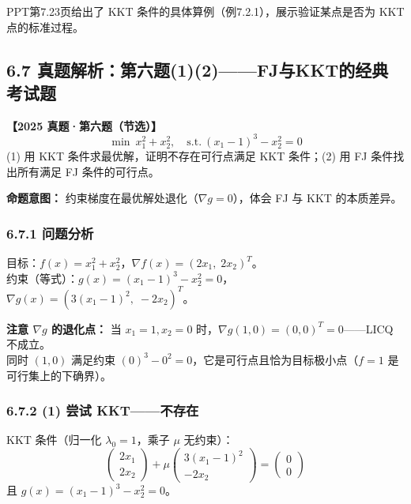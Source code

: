 \medskip
PPT第7.23页给出了 KKT 条件的具体算例（例7.2.1），展示验证某点是否为 KKT 点的标准过程。
\medskip
{}
\medskip

\subsection{6.7 真题解析：第六题(1)(2)——FJ与KKT的经典考试题}

\begin{notebox}
\textbf{【2025 真题·第六题（节选）】}
\[
\min\ x_1^2 + x_2^2,\quad \text{s.t.}\ (x_1-1)^3 - x_2^2 = 0
\]
(1) 用 KKT 条件求最优解，证明不存在可行点满足 KKT 条件；(2) 用 FJ 条件找出所有满足 FJ 条件的可行点。

\textbf{命题意图：} 约束梯度在最优解处退化（$\nabla g=0$），体会 FJ 与 KKT 的本质差异。
\end{notebox}

\subsubsection{6.7.1 问题分析}

目标：$f(x)=x_1^2+x_2^2$，$\nabla f(x)=(2x_1,\;2x_2)^T$。\\
约束（等式）：$g(x)=(x_1-1)^3-x_2^2=0$，$\nabla g(x)=(3(x_1-1)^2,\;-2x_2)^T$。

\textbf{注意 $\nabla g$ 的退化点：} 当 $x_1=1,x_2=0$ 时，$\nabla g(1,0)=(0,0)^T=0$——LICQ 不成立。\\[2pt]
同时 $(1,0)$ 满足约束 $(0)^3-0^2=0$，它是可行点且恰为目标极小点（$f=1$ 是可行集上的下确界）。

\subsubsection{6.7.2 (1) 尝试 KKT——不存在}

KKT 条件（归一化 $\lambda_0=1$，乘子 $\mu$ 无约束）：
\[
\begin{pmatrix} 2x_1 \\ 2x_2 \end{pmatrix}
+ \mu \begin{pmatrix} 3(x_1-1)^2 \\ -2x_2 \end{pmatrix}
= \begin{pmatrix} 0 \\ 0 \end{pmatrix}
\]
且 $g(x)=(x_1-1)^3-x_2^2=0$。

